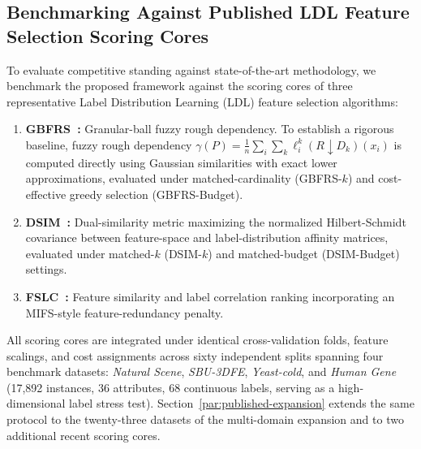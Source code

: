 \subsection{Benchmarking Against Published LDL Feature Selection Scoring Cores}
\label{sec:paper-published}

To evaluate competitive standing against state-of-the-art methodology, we benchmark the proposed framework against the scoring cores of three representative Label Distribution Learning (LDL) feature selection algorithms:
\begin{enumerate}[label=(\arabic*), leftmargin=*]
	\item \textbf{GBFRS~\cite{Qian2023GBLDL}:} Granular-ball fuzzy rough dependency. To establish a rigorous baseline, fuzzy rough dependency $\gamma(P) = \frac{1}{n}\sum_{i}\sum_{k}\ell_i^k (R \!\downarrow\! D_k)(x_i)$ is computed directly using Gaussian similarities with exact lower approximations, evaluated under matched-cardinality (GBFRS-$k$) and cost-effective greedy selection (GBFRS-Budget).
	\item \textbf{DSIM~\cite{DL}:} Dual-similarity metric maximizing the normalized Hilbert-Schmidt covariance between feature-space and label-distribution affinity matrices, evaluated under matched-$k$ (DSIM-$k$) and matched-budget (DSIM-Budget) settings.
	\item \textbf{FSLC~\cite{QX}:} Feature similarity and label correlation ranking incorporating an MIFS-style feature-redundancy penalty.
\end{enumerate}
All scoring cores are integrated under identical cross-validation folds, feature scalings, and cost assignments across sixty independent splits spanning four benchmark datasets: \textit{Natural Scene}, \textit{SBU-3DFE}, \textit{Yeast-cold}, and \textit{Human Gene} (17,892 instances, 36 attributes, 68 continuous labels, serving as a high-dimensional label stress test). Section~\ref{par:published-expansion} extends the same protocol to the twenty-three datasets of the multi-domain expansion and to two additional recent scoring cores.

